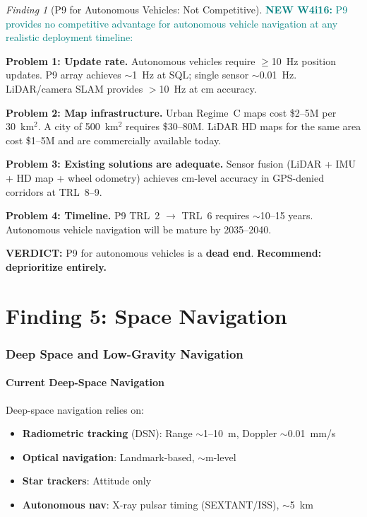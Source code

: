 \documentclass[11pt]{article}
\theoremstyle{definition}
\theoremstyle{remark}
\newtheorem{finding}[theorem]{Finding}
\newcommand{\verdict}[1]{\textcolor{green!50!black}{\textbf{VERDICT:} #1}}
\newcommand{\newfinding}[1]{\textcolor{teal}{\textbf{NEW W4i16:} #1}}
\begin{document}
\begin{finding}[P9 for Autonomous Vehicles: Not Competitive]
\label{find:av-dead}
\newfinding{P9 provides no competitive advantage for autonomous
vehicle navigation at any realistic deployment timeline:}

\textbf{Problem 1: Update rate.}
Autonomous vehicles require $\geq$10~Hz position updates.
P9 array achieves $\sim$1~Hz at SQL; single sensor $\sim$0.01~Hz.
LiDAR/camera SLAM provides $>$10~Hz at cm accuracy.

\textbf{Problem 2: Map infrastructure.}
Urban Regime~C maps cost \$2--5M per 30~km$^2$. A city of
500~km$^2$ requires \$30--80M. LiDAR HD maps for the same area
cost \$1--5M and are commercially available today.

\textbf{Problem 3: Existing solutions are adequate.}
Sensor fusion (LiDAR + IMU + HD map + wheel odometry) achieves
cm-level accuracy in GPS-denied corridors at TRL~8--9.

\textbf{Problem 4: Timeline.}
P9 TRL~2 $\to$ TRL~6 requires $\sim$10--15 years.
Autonomous vehicle navigation will be mature by 2035--2040.

\verdict{P9 for autonomous vehicles is a \textbf{dead end}.
\textbf{Recommend: deprioritize entirely.}}
\end{finding}

\part{Finding 5: Space Navigation}
\label{part:space}

\section{Deep Space and Low-Gravity Navigation}
\label{sec:deep-space}

\subsection{Current Deep-Space Navigation}

Deep-space navigation relies on:
\begin{itemize}[nosep]
  \item \textbf{Radiometric tracking} (DSN): Range $\sim$1--10~m,
    Doppler $\sim$0.01~mm/s
  \item \textbf{Optical navigation}: Landmark-based, $\sim$m-level
  \item \textbf{Star trackers}: Attitude only
  \item \textbf{Autonomous nav}: X-ray pulsar timing
    (SEXTANT/ISS), $\sim$5~km
\end{itemize}
\end{document}
